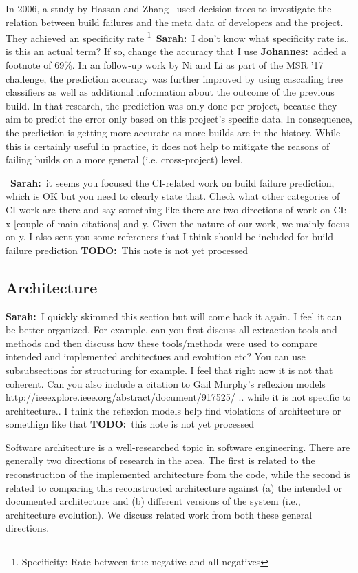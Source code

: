 \documentclass[sigplan, anonymous, review]{acmart}
\newcommand{\sn}[1]{{\color{blue}\textbf{Sarah:}~#1}}
\newcommand{\jk}[1]{{\color{violet}\textbf{Johannes:}~#1}}
\newcommand{\todo}[1]{{ \color{red} \textbf{TODO:}~#1}}
\begin{document}
In 2006, a study by Hassan and Zhang~\cite{Pred-Tree} used decision trees to investigate the relation between build failures and the meta data of developers and the project.
They achieved an specificity rate \footnote{Specificity: Rate between true negative and all negatives}~\sn{I don't know what specificity rate is.. is this an actual term? If so, change the accuracy that I use} \jk{added a footnote} of 69\%.
In an follow-up work by Ni and Li as part of the MSR '17 challenge, the prediction accuracy was further improved by using cascading tree classifiers as well as additional information about the outcome of the previous build\cite{Pred-Cascade}. 
In that research, the prediction was only done per project, because they aim to predict the error only based on this project's specific data. In consequence, the prediction is getting more accurate as more builds are in the history.
While this is certainly useful in practice, it does not help to mitigate the reasons of failing builds on a more general (i.e. cross-project) level.

~\sn{it seems you focused the CI-related work on build failure prediction, which is OK but you need to clearly state that. Check what other categories of CI work are there and say something like there are two directions of work on CI: x [couple of main citations] and y. Given the nature of our work, we mainly focus on y. I also sent you some references that I think should be included for build failure prediction} \todo{This note is not yet processed}

\subsection{Architecture}
\label{sec:relwork-arch}

\sn{I quickly skimmed this section but will come back it again. I feel it can be better organized. For example, can you first discuss all extraction tools and methods and then discuss how these tools/methods were used to compare intended and implemented architectues and evolution etc? You can use subsubsections for structuring for example. I feel that right  now it is not that coherent. Can you also include a citation to Gail Murphy's reflexion models http://ieeexplore.ieee.org/abstract/document/917525/ .. while it is not specific to architecture.. I think the reflexion models help find violations of architecture or somethign like that} \todo{this note is not yet processed}

Software architecture is a well-researched topic in software engineering.
There are generally two directions of research in the area.
The first is related to the reconstruction of the implemented architecture from the code, while the second is related to comparing this reconstructed architecture against (a) the intended or documented architecture and (b) different versions of the system (i.e., architecture evolution).
We discuss related work from both these general directions.
\end{document}
